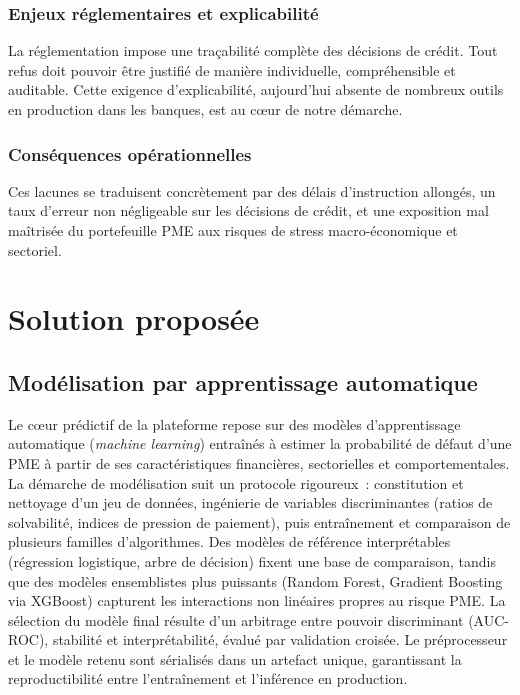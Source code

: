 \documentclass[a4paper,12pt,oneside]{report}
\begin{document}
\subsubsection{Enjeux réglementaires et explicabilité}

La réglementation impose une traçabilité complète des décisions de crédit. Tout refus doit
pouvoir être justifié de manière individuelle, compréhensible et auditable. Cette exigence
d'explicabilité, aujourd'hui absente de nombreux outils en production dans les banques, est au
c\oe ur de notre démarche.

\subsubsection{Conséquences opérationnelles}

Ces lacunes se traduisent concrètement par des délais d'instruction allongés, un taux
d'erreur non négligeable sur les décisions de crédit, et une exposition mal maîtrisée du
portefeuille PME aux risques de stress macro-économique et sectoriel.

\section{Solution proposée}

\subsection{Modélisation par apprentissage automatique}

Le c\oe ur prédictif de la plateforme repose sur des modèles d'apprentissage automatique
(\textit{machine learning}) entraînés à estimer la probabilité de défaut d'une PME à partir de
ses caractéristiques financières, sectorielles et comportementales. La démarche de modélisation
suit un protocole rigoureux~: constitution et nettoyage d'un jeu de données, ingénierie de
variables discriminantes (ratios de solvabilité, indices de pression de paiement), puis
entraînement et comparaison de plusieurs familles d'algorithmes. Des modèles de référence
interprétables (régression logistique, arbre de décision) fixent une base de comparaison,
tandis que des modèles ensemblistes plus puissants (Random Forest, Gradient Boosting via
XGBoost) capturent les interactions non linéaires propres au risque PME. La sélection du modèle
final résulte d'un arbitrage entre pouvoir discriminant (AUC-ROC), stabilité et
interprétabilité, évalué par validation croisée. Le préprocesseur et le modèle retenu sont
sérialisés dans un artefact unique, garantissant la reproductibilité entre l'entraînement et
l'inférence en production.
\end{document}
